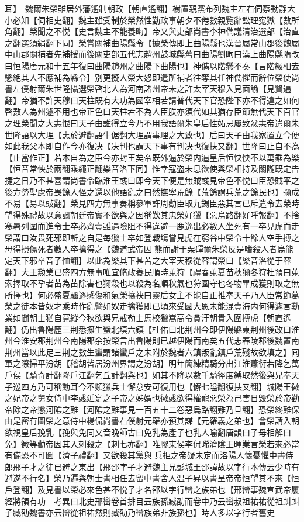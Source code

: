 耳】　魏爾朱榮雖居外藩遙制朝政【朝直遙翻】樹置親黨布列魏主左右伺察動静大小必知【伺相吏翻】魏主雖受制於榮然性勤政事朝夕不倦數親覽辭訟理寃獄【數所角翻】榮聞之不悦【史言魏主不能養晦】帝又與吏部尚書李神儁議清治選部【治直之翻選須絹翻下同】榮嘗關補曲陽縣令【據榮傳即上曲陽縣也漢晉屬常山郡後魏屬中山郡關補者先補授而後關吏部五代志趙州鼓城縣舊曰曲陽劉昫曰漢上曲陽縣隋改曰恒陽唐元和十五年復曰曲陽趙州之曲陽下曲陽也】神儁以階懸不奏【言階級相去懸絶其人不應補為縣令】别更擬人榮大怒即遣所補者往奪其任神儁懼而辭位榮使尚書左僕射爾朱世隆攝選榮啓北人為河南諸州帝未之許太宰天穆入見面諭【見賢遍翻】帝猶不許天穆曰天柱既有大功為國宰相若請普代天下官恐陛下亦不得違之如何啓數人為州遽不用也帝正色曰天柱若不為人臣朕亦須代如其猶存臣節無代天下百官之理榮聞之大恚恨曰天子由誰得立今乃不用我語爾朱皇后性妬忌屢致忿恚帝遣爾朱世隆語以大理【恚於避翻語牛倨翻大理謂事理之大致也】后曰天子由我家置立今便如此我父本即自作今亦復决【决判也謂天下事有判决也復扶又翻】世隆曰止自不為【止當作正】若本自為之臣今亦封王矣帝既外逼於榮内逼皇后恒快怏不以萬乘為樂【恒音常怏於兩翻乘繩正翻樂音洛下同】惟幸寇盗未息欲使與榮相持及關隴既定告捷之日乃不甚喜謂尚書令臨淮王彧曰即今天下便是無賊彧見帝色不悦曰臣恐賊平之後方勞聖慮帝畏餘人怪之還以他語亂之曰然撫寧荒餘【荒餘謂兵荒之餘民也】彌成不易【易以䜴翻】榮見四方無事奏稱參軍許周勸臣取九錫臣惡其言已斥遣令去榮時望得殊禮故以意諷朝廷帝實不欲與之因稱歎其忠榮好獵【惡烏路翻好呼報翻】不捨寒暑列圍而進令士卒必齊壹雖遇險阻不得違避一鹿逸出必數人坐死有一卒見虎而走榮謂曰汝畏死邪即斬之自是每獵士卒如登戰塲嘗見虎在窮谷中榮令十餘人空手搏之毋得損傷死者數人卒擒得之【魏道武帝因熊而謝于栗磾爾朱榮反是嗜殺人者烏能定天下邪卒音子恤翻】以此為樂其下甚苦之大宰天穆從容謂榮曰【樂音洛從于容翻】大王勲業已盛四方無事唯宜脩政養民順時蒐狩【禮春蒐夏苗秋獮冬狩杜預曰蒐索擇取不孕者苖為苖除害也獮殺也以殺為名順秋氣也狩圍守也冬物畢成獲則取之無所擇也】何必盛夏驅逐感傷和氣榮攘袂曰靈后女主不能自正推奉天子乃人臣常節葛榮之徒本皆奴才乘時作亂譬如奴走擒獲即已頃來受國大恩未能混壹海内何得遽言勳業如聞朝士猶自寛縱今秋欲與兄戒勒士馬校獵嵩高令貪汙朝貴入圍搏虎【朝直遙翻】仍出魯陽歷三荆悉擁生蠻北填六鎮【杜佑曰北荆州今即伊陽縣東荆州後改曰淮州今淮安郡荆州今南陽郡余按榮言出魯陽則已越伊陽而南矣五代志舂陵郡後魏置南荆州當以此足三荆之數生蠻謂諸蠻戶之未附於魏者六鎮叛亂鎮戶荒殘故欲填之】囘軍之際掃平汾胡【稽胡皆居汾州界謂之汾胡】明年簡練精騎分出江淮蕭衍若降乞萬戶侯【騎奇計翻降戶江翻乞丘計翻與也】如其不降以數千騎徑度縛取然後與兄奉天子巡四方乃可稱勳耳今不頻獵兵士懈怠安可復用也【懈七隘翻復扶又翻】城陽王徽之妃帝之舅女侍中李彧延寔之子帝之姊婿也徽彧欲得權寵惡榮為己害日毁榮於帝勸帝除之帝懲河隂之難【河隂之難事見一百五十二卷惡烏路翻難乃旦翻】恐榮終難保由是密有圖榮之意侍中楊侃尚書右僕射元羅亦預其謀【元羅義之弟也】會榮請入朝欲視皇后㝃乳【㝃與免同又音晩師古曰免乳為產子也乳人喻翻唐韻曰子母相解曰免】徽等勸帝因其入刺殺之【刺七亦翻】唯膠東侯李侃晞濟隂王暉業言榮若來必當有備恐不可圖【濟子禮翻】又欲殺其黨與兵拒之帝疑未定而洛陽人懷憂懼中書侍郎郉子才之徒已避之東出【郉邵字子才避魏主兄彭城王邵諱故以字行本傳云少時有避遂不行名】榮乃遍與朝士書相任去留中書舍人温子昇以書呈帝帝恒望其不來【恒戶登翻】及見書以榮必來色甚不悦子才名邵以字行巒之族弟也【邢巒事魏宣武帝屢經將領有功　考異曰北史邢巒卷首排目云族孫臧劭而卷中乃云巒叔祖祐祐從祖虯虯子臧劭魏書亦云巒從祖祐然則臧劭乃巒族弟非族孫也】時人多以字行者舊史